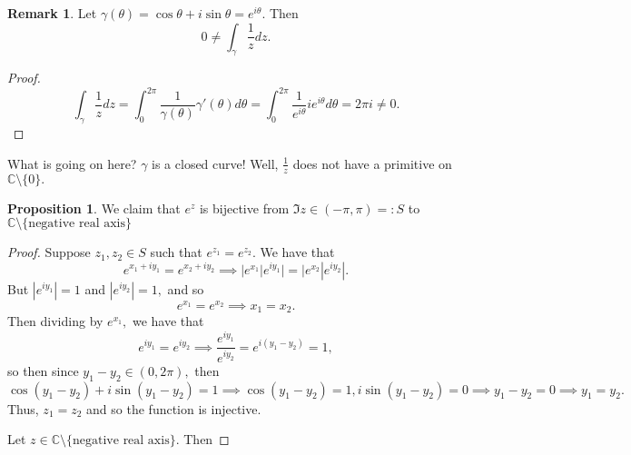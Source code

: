\documentclass[10pt, oneside]{article}
\newcommand{\bbC}{\mathbb{C}}
\newcommand{\sm}{\setminus}
\theoremstyle{definition}
\newtheorem{prop}{Proposition}
\newtheorem{rem}{Remark}
\begin{document}
\begin{rem}
    Let $\gamma(\theta) = \cos \theta + i\sin \theta = e^{i\theta}.$ Then 
    \[0 \neq \int_\gamma \frac{1}{z}dz.\]
\begin{proof}
    \[\int_\gamma \frac{1}{z}dz = \int_0^{2\pi}\frac{1}{\gamma(\theta)}\gamma'(\theta)d\theta = \int_0^{2\pi}\frac{1}{e^{i\theta}}ie^{i\theta}d\theta = 2\pi i \neq 0.\]
\end{proof}
What is going on here? $\gamma$ is a closed curve! Well, $\frac{1}{z}$ does not have a primitive on $\bbC \sm \{0\}.$
\end{rem}
\begin{prop}
    We claim that $e^z$ is bijective from $\Im{z} \in (-\pi, \pi) =: S$ to $\bbC\sm\{\text{negative real axis}\}$
\end{prop}
\begin{proof}
    Suppose $z_1, z_2 \in S$ such that $e^{z_1} = e^{z_2}.$ We have that 
    \[e^{x_1 + iy_1} = e^{x_2 + iy_2} \implies |e^{x_1}|e^{iy_1}| = |e^{x_2}|e^{iy_2}|.\] But $|e^{iy_1}| = 1$ and $|e^{iy_2}| = 1,$ and so 
    \[e^{x_1} = e^{x_2} \implies x_1 = x_2.\] Then dividing by $e^{x_1},$ we have that 
    \[e^{iy_1} = e^{i y_2} \implies \frac{e^{i y_1}}{e^{i y_2}} =e^{i(y_1 - y_2)} = 1,\] so then since $y_1 - y_2 \in (0, 2\pi),$ then
    \[\cos(y_1 - y_2) + i \sin (y_1 - y_2) = 1 \implies \cos(y_1 - y_2) = 1, i\sin(y_1 - y_2) = 0 \implies y_1 - y_2 = 0 \implies y_1 = y_2.\] Thus, $z_1 = z_2$ and so the function is injective. 

    Let $z \in \bbC\sm\{\text{negative real axis}\}.$ Then 
\end{proof}
\end{document}
